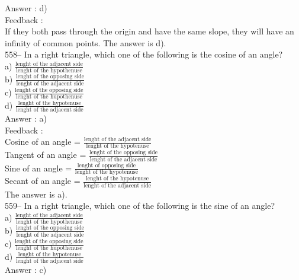 \documentclass[letterpaper, 12pt]{article}
\begin{document}
Answer : d)\\

Feedback : \\
If they both pass through the origin and have the same slope, they will have an infinity of common points. The answer is d).\\

558-- In a right triangle, which one of the following is the cosine of an angle?\\[2mm]
a) $\frac{\textrm{lenght of the adjacent side}}{\textrm{lenght of the hypothenuse}}$\\[2mm]
b) $\frac{\textrm{lenght of the opposing side}}{\textrm{lenght of the adjacent side}}$\\[2mm]
c) $\frac{\textrm{lenght of the opposing side}}{\textrm{lenght of the hupothenuse}}$\\[2mm]
d) $\frac{\textrm{lenght of the hypotenuse}}{\textrm{lenght of the adjacent side}}$\\

Answer : a)\\

Feedback : \\
Cosine of an angle = $\frac{\textrm{lenght of the adjacent side}}{\textrm{lenght of the hypotenuse}}$\\[2mm]
Tangent of an angle = $\frac{\textrm{lenght of the opposing side}}{\textrm{lenght of the adjacent side}}$\\[2mm]
Sine of an angle = $\frac{\textrm{lenght of opposing side}}{\textrm{lenght of the hypotenuse}}$\\[2mm]
Secant of an angle =  $\frac{\textrm{lenght of the hypotenuse}}{\textrm{lenght of the adjacent side}}$\\[2mm]
The answer is a).\\

559-- In a right triangle, which one of the following is the sine of an angle?\\[2mm]
a) $\frac{\textrm{lenght of the adjacent side}}{\textrm{lenght of the hypothenuse}}$\\[2mm]
b) $\frac{\textrm{lenght of the opposing side}}{\textrm{lenght of the adjacent side}}$\\[2mm]
c) $\frac{\textrm{lenght of the opposing side}}{\textrm{lenght of the hupothenuse}}$\\[2mm]
d) $\frac{\textrm{lenght of the hypotenuse}}{\textrm{lenght of the adjacent side}}$\\
Answer : c)\\
\end{document}
